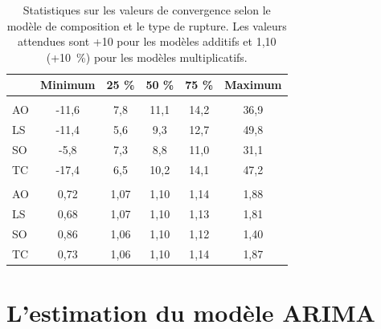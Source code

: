 \documentclass[12pt, a4paper, french]{article}
\begin{document}
\begin{table}[h]
\caption[Statistiques sur les valeurs de convergence selon le modèle de composition et le type de rupture. Les valeurs attendues sont +10 pour les modèles additifs et 1,10 (+10~\%) pour les modèles multiplicatifs]{Statistiques sur les valeurs de convergence selon le modèle de composition et le type de rupture. Les valeurs attendues sont +10 pour les modèles additifs et 1,10 (+10~\%) pour les modèles multiplicatifs.}\label{table:AOvaleur} 
\begin{center}
\begin{tabular}{lccccc}
\toprule
  & Minimum & 25 \% & 50 \% & 75 \% & Maximum\\
\midrule
\addlinespace[0.3em]
\multicolumn{6}{l}{\textbf{Modèles additifs}}\\
\hspace{1em}AO & -11,6 & 7,8 & 11,1 & 14,2 & 36,9\\
\hspace{1em}LS & -11,4 & 5,6 & 9,3 & 12,7 & 49,8\\
\hspace{1em}SO & -5,8 & 7,3 & 8,8 & 11,0 & 31,1\\
\hspace{1em}TC & -17,4 & 6,5 & 10,2 & 14,1 & 47,2\\
\addlinespace[0.3em]
\multicolumn{6}{l}{\textbf{Modèles multiplicatifs}}\\
\hspace{1em}AO & 0,72 & 1,07 & 1,10 & 1,14 & 1,88\\
\hspace{1em}LS & 0,68 & 1,07 & 1,10 & 1,13 & 1,81\\
\hspace{1em}SO & 0,86 & 1,06 & 1,10 & 1,12 & 1,40\\
\hspace{1em}TC & 0,73 & 1,06 & 1,10 & 1,14 & 1,87\\
\bottomrule
\end{tabular}
\end{center}
\end{table}


\clearpage

\section{L'estimation du modèle ARIMA}
\end{document}
